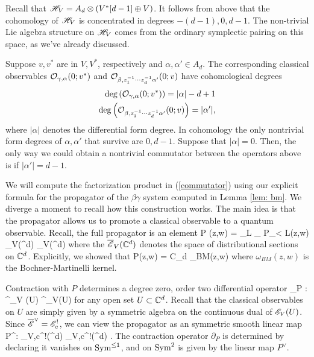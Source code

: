 Recall that $\mathscr H_V = A_d \otimes (V^*[d-1] \oplus V)$.
It follows from above that the cohomology of $\mathscr H_V$ is concentrated in degrees $-(d-1), 0, d-1$. 
The non-trivial Lie algebra structure on $\mathscr H_V$ comes from the ordinary symplectic pairing on this space, as we've already discussed. 

Suppose $v,v^*$ are in $V,V^*$, respectively and $\alpha,\alpha' \in A_d$.
The corresponding classical observables $\mathcal O_{\gamma,\alpha}(0;v^*)$ and $\mathcal O_{\beta, z_1^{-1}\cdots z_d^{-1} \alpha'}(0;v)$ have cohomological degrees
\begin{align*}
{\rm deg}\left(\mathcal O_{\gamma,\alpha}(0;v^*)\right) = |\alpha| - d + 1 \\
{\rm deg}\left(\mathcal O_{\beta, z_1^{-1}\cdots z_d^{-1} \alpha'}(0;v)\right) = |\alpha'|,
\end{align*}
where $|\alpha|$ denotes the differential form degree.
In cohomology the only nontrivial form degrees of $\alpha,\alpha'$ that survive are $0,d-1$. 
Suppose that $|\alpha| = 0$.
Then, the only way we could obtain a nontrivial commutator between the operators above is if $|\alpha'| = d-1$. 

We will compute the factorization product in (\ref{commutator}) using our explicit formula for the propagator of the $\beta\gamma$ system computed in Lemma \ref{lem: bm}.
We diverge a moment to recall how this construction works.
The main idea is that the propagator allows us to promote a classical observable to a quantum observable.
Recall, the full propagator is an element
\ben 
P (z,w) = \lim_{L\to \infty} \lim_{\epsilon {}} P_{\epsilon < L}(z,w) \in \Bar{\sE}_V(\CC^d) \Hat{\tensor} \Bar{\sE}_V(\CC^d)
\een
where the $\overline{\mathscr E}_V(\mathbb C^d)$ denotes the space of distributional sections on $\mathbb C^d$.
Explicitly, we showed that 
\ben
P(z,w) = C_d \;\omega_{BM}(z,w) 
\een
where $\omega_{BM}(z,w)$ is the Bochner-Martinelli kernel.

Contraction with $P$ determines a degree zero, order two differential operator
\ben
\partial_{P} : \Obs^{\cl}_V (U) \to \Obs^{\cl}_{V}(U)
\een
for any open set $U \subset \mathbb C^d$. 
Recall that the classical observables on $U$ are simply given by a symmetric algebra on the continuous dual of $\mathscr E_V(U)$. 
Since $\overline{\mathscr E}^\vee = \mathscr E_c^!$, we can view the propagator as an symmetric smooth linear map
\ben
P^\vee : \sE_{V,c}^!(\CC^d) \Hat{\tensor} \sE_{V,c}^!(\CC^d) \to \CC .
\een
The contraction operator $\partial_P$ is determined by declaring it vanishes on ${\rm Sym}^{\leq 1}$, and on ${\rm Sym}^2$ is given by the linear map $P^\vee$. 


